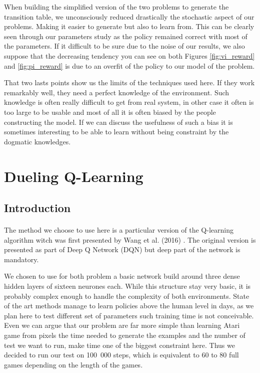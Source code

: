 \documentclass[twocolumn,a4paper,10pt]{article}
\begin{document}
When building the simplified version of the two problems to generate
the transition table, we unconsciously reduced drastically the stochastic
aspect of our problems. Making it easier to generate but also to learn
from. This can be clearly seen through our parameters study as the
policy remained correct with most of the parameters. If it difficult
to be sure due to the noise of our results, we also suppose that the
decreasing tendency you can see on both Figures \ref{fig:vi_reward}
and \ref{fig:pi_reward} is due to an overfit of the policy to our
model of the problem.

That two lasts points show us the limits of the techniques used here.
If they work remarkably well, they need a perfect knowledge of the
environment. Such knowledge is often really difficult to get from
real system, in other case it often is too large to be usable and
most of all it is often biased by the people constructing the model.
If we can discuss the usefulness of such a bias it is sometimes interesting
to be able to learn without being constraint by the dogmatic knowledges.

\section{Dueling Q-Learning}

\subsection{Introduction}

\paragraph{}

The method we choose to use here is a particular version of the Q-learning
algorithm witch was first presented by Wang et al. (2016) \cite{DuelingQL}.
The original version is presented as part of Deep Q Network (DQN)
but deep part of the network is mandatory.

We chosen to use for both problem a basic network build around three
dense hidden layers of sixteen neurones each. While this structure
stay very basic, it is probably complex enough to handle the complexity
of both environments. State of the art methods manage to learn policies
above the human level in days, as we plan here to test different set
of parameters such training time is not conceivable. Even we can argue
that our problem are far more simple than learning Atari game from
pixels the time needed to generate the examples and the number of
test we want to run, make time one of the biggest constraint here.
Thus we decided to run our test on 100~000 steps, which is equivalent
to 60 to 80 full games depending on the length of the games.
\end{document}

